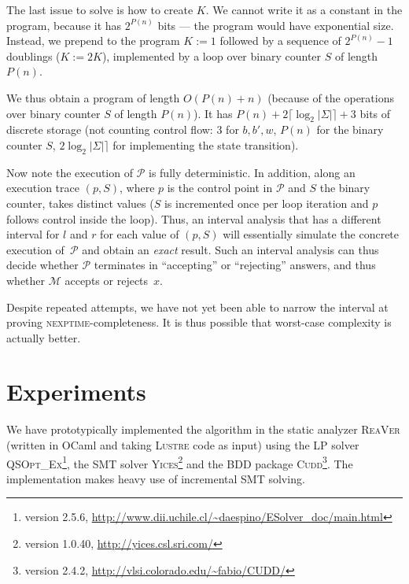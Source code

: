 \documentclass{llncs}
\newcommand{\rronly}[1]{#1}
\newcommand{\calM}{\mathcal{M}}
\newcommand{\calP}{\mathcal{P}}
\begin{document}
{The last issue to solve is how to create $K$. We cannot write it as a
constant in the program, because it has $2^{P(n)}$ bits --- the
program would have exponential size. Instead, we prepend to the
program $K:=1$ followed by a sequence of $2^{P(n)}-1$ doublings ($K :=
2K$), implemented by a loop over binary counter $S$ of length $P(n)$.

We thus obtain a program of length $O(P(n)+n)$ (because of the
operations over binary counter $S$ of length $P(n)$). It has $P(n)+
2\lceil \log_2 |\Sigma|\rceil + 3$ bits of discrete storage (not
counting control flow: $3$ for $b,b',w$, $P(n)$ for the binary counter
$S$, $2 \log_2 |\Sigma|\rceil$ for implementing the state transition).

Now note the execution of $\calP$ is fully deterministic. In addition,
along an execution trace $(p,S)$, where $p$ is the control point in
$\calP$ and $S$ the binary counter, takes distinct values ($S$ is
incremented once per loop iteration and $p$ follows control inside the
loop).  Thus, an interval analysis that has a different interval for
$l$ and $r$ for each value of $(p,S)$ will essentially simulate the
concrete execution of~$\calP$ and obtain an \emph{exact} result.  Such
an interval analysis can thus decide whether $\calP$ terminates in
``accepting'' or ``rejecting'' answers, and thus whether $\calM$
accepts or rejects~$x$.



Despite repeated attempts, we have not yet been able to narrow the
interval at proving \textsc{nexptime}-completeness. It is thus
possible that worst-case complexity is actually better.  
}

\section{Experiments}

We have prototypically implemented the algorithm in the static
analyzer \textsc{ReaVer} \cite{Sch12} (\rronly{written in OCaml and
}taking \textsc{Lustre} code as input) using the LP solver
\textsc{QSOpt\_Ex}\footnote{version 2.5.6,
  \url{http://www.dii.uchile.cl/~daespino/ESolver_doc/main.html}}, the
SMT solver \textsc{Yices}\footnote{version 1.0.40,
  \url{http://yices.csl.sri.com/}} and the BDD package
\textsc{Cudd}\footnote{version 2.4.2,
  \url{http://vlsi.colorado.edu/~fabio/CUDD/}}.  The implementation
makes heavy use of incremental SMT solving.
\end{document}
